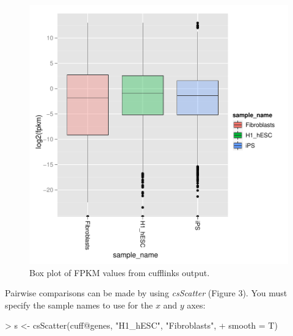 \documentclass[10pt]{article}
\newcommand{\Rmethod}[1]{{\textit{#1}}}
\begin{document}
\begin{figure}[ht]
\begin{center}
\includegraphics{cummeRbund-manual-global_plots_box}

\end{center}
\caption{Box plot of FPKM values from cufflinks output.}
\end{figure}

Pairwise comparisons can be made by using \Rmethod{csScatter} (Figure 3). You must specify the sample names to use for the $x$ and $y$ axes:
\begin{Schunk}
\begin{Sinput}
> s <- csScatter(cuff@genes, "H1_hESC", "Fibroblasts", 
+     smooth = T)
\end{Sinput}
\end{Schunk}
\end{document}
